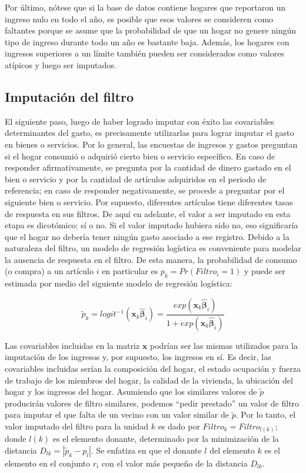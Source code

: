 \documentclass[
  12pt,
  spanish,
]{book}
\begin{document}
Por último, nótese que si la base de datos contiene hogares que reportaron un ingreso nulo en todo el año, es posible que esos valores se consideren como faltantes porque se asume que la probabilidad de que un hogar no genere ningún tipo de ingreso durante todo un año es bastante baja. Además, los hogares con ingresos superiores a un límite también pueden ser considerados como valores atípicos y luego ser imputados.

\hypertarget{imputaciuxf3n-del-filtro}{%
\subsection{Imputación del filtro}\label{imputaciuxf3n-del-filtro}}

El siguiente paso, luego de haber logrado imputar con éxito las covariables determinantes del gasto, es precisamente utilizarlas para lograr imputar el gasto en bienes o servicios. Por lo general, las encuestas de ingresos y gastos preguntan si el hogar consumió o adquirió cierto bien o servicio específico. En caso de responder afirmativamente, se pregunta por la cantidad de dinero gastado en el bien o servicio y por la cantidad de artículos adquiridos en el periodo de referencia; en caso de responder negativamente, se procede a preguntar por el siguiente bien o servicio. Por supuesto, diferentes artículos tiene diferentes tasas de respuesta en sus filtros. De aquí en adelante, el valor a ser imputado en esta etapa es dicotómico: sí o no. Si el valor imputado hubiera sido no, eso significaría que el hogar no debería tener ningún gasto asociado a ese registro. Debido a la naturaleza del filtro, un modelo de regresión logística es conveniente para modelar la ausencia de respuesta en el filtro. De esta manera, la probabilidad de consumo (o compra) a un artículo \(i\) en particular es \(p_k = Pr(Filtro_i = 1)\) y puede ser estimada por medio del siguiente modelo de regresión logística:

\[
\tilde{p}_k = logit^{-1}(\mathbf{x}_k \hat{\boldsymbol{\beta}}_i) =
\frac{exp(\mathbf{x}_k \hat{\boldsymbol{\beta}}_i)}{1+exp(\mathbf{x}_k \hat{\boldsymbol{\beta}}_i)}
\]

Las covariables incluidas en la matriz \(\mathbf{x}\) podrían ser las mismas utilizados para la imputación de los ingresos y, por supuesto, los ingresos en sí. Es decir, las covariables incluidas serían la composición del hogar, el estado ocupación y fuerza de trabajo de los miembros del hogar, la calidad de la vivienda, la ubicación del hogar y los ingresos del hogar. Asumiendo que los similares valores de \(\tilde p\) producirán valores de filtro similares, podemos ``pedir prestado'' un valor de filtro para imputar el que falta de un vecino con un valor similar de \(\tilde p\). Por lo tanto, el valor imputado del filtro para la unidad \(k\) es dado por \(Filtro_k = Filtro_{l(k)}\); donde \(l(k)\) es el elemento donante, determinado por la minimización de la distancia \(D_{lk} = |\tilde p_k - p_l|\). Se enfatiza en que el donante \(l\) del elemento \(k\) es el elemento en el conjunto \(r_i\) con el valor más pequeño de la distancia \(D_{lk}\).
\end{document}

